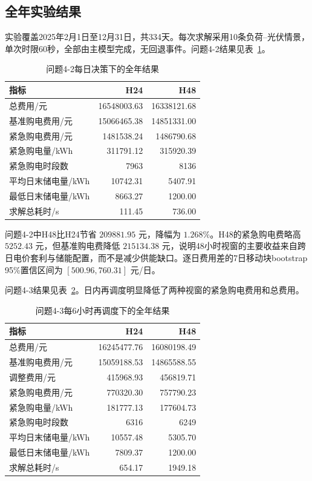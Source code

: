 \documentclass[UTF8,12pt,a4paper]{ctexart}
\begin{document}
\subsection{全年实验结果}

实验覆盖2025年2月1日至12月31日，共334天。每次求解采用10条负荷--光伏情景，单次时限60秒，全部由主模型完成，无回退事件。问题4-2结果见表~\ref{tab:q42summary}。

\begin{table}[H]
\centering
\caption{问题4-2每日决策下的全年结果}
\label{tab:q42summary}
\begin{tabular}{lrr}
\toprule
指标 & H24 & H48\\
\midrule
总费用/元 & 16548003.63 & 16338121.68\\
基准购电费用/元 & 15066465.38 & 14851331.00\\
紧急购电费用/元 & 1481538.24 & 1486790.68\\
紧急购电量/kWh & 311791.12 & 315920.39\\
紧急购电时段数 & 7963 & 8136\\
平均日末储电量/kWh & 10742.31 & 5407.91\\
最低日末储电量/kWh & 8663.27 & 1200.00\\
求解总耗时/s & 111.45 & 736.00\\
\bottomrule
\end{tabular}
\end{table}

问题4-2中H48比H24节省 $209881.95$ 元，降幅为 $1.268\%$。H48的紧急购电费略高 $5252.43$ 元，但基准购电费降低 $215134.38$ 元，说明48小时视窗的主要收益来自跨日电价套利与储能配置，而不是减少供能缺口。逐日费用差的7日移动块bootstrap 95\%置信区间为 $[500.96,760.31]$ 元/日。

问题4-3结果见表~\ref{tab:q43summary}。日内再调度明显降低了两种视窗的紧急购电费用和总费用。

\begin{table}[H]
\centering
\caption{问题4-3每6小时再调度下的全年结果}
\label{tab:q43summary}
\begin{tabular}{lrr}
\toprule
指标 & H24 & H48\\
\midrule
总费用/元 & 16245477.76 & 16080198.49\\
基准购电费用/元 & 15059188.53 & 14865588.55\\
调整费用/元 & 415968.93 & 456819.71\\
紧急购电费用/元 & 770320.30 & 757790.23\\
紧急购电量/kWh & 181777.13 & 177604.73\\
紧急购电时段数 & 6316 & 6249\\
平均日末储电量/kWh & 10557.48 & 5305.70\\
最低日末储电量/kWh & 7809.37 & 1200.00\\
求解总耗时/s & 654.17 & 1949.18\\
\bottomrule
\end{tabular}
\end{table}
\end{document}
